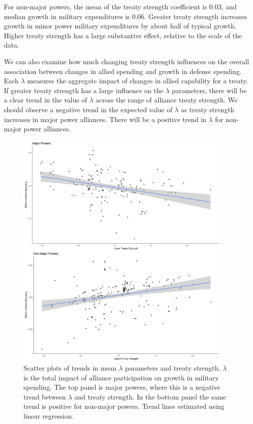 \documentclass[12pt]{article}
\begin{document}
For non-major powers, the mean of the treaty strength coefficient is 0.03, and median growth in military expenditures is 0.06. 
Greater treaty strength increases growth in minor power military expenditures by about half of typical growth. 
Higher treaty strength has a large substantive effect, relative to the scale of the data. 


We can also examine how much changing treaty strength influences on the overall association between changes in allied spending and growth in defense spending. 
Each $\lambda$ measures the aggregate impact of changes in allied capability for a treaty. 
If greater treaty strength has a large influence on the $\lambda$ parameters, there will be a clear trend in the value of $\lambda$ across the range of alliance treaty strength.
We should observe a negative trend in the expected value of $\lambda$ as treaty strength increases in major power alliances. 
There will be a positive trend in $\lambda$ for non-major power alliances. 


\begin{figure}[htbp]
	\centering
		\includegraphics[width=0.95\textwidth]{../figures/lambda-ls-scatter.png}
	\caption{Scatter plots of trends in mean $\lambda$ parameters and treaty strength. $\lambda$ is the total impact of alliance participation on growth in military spending. The top panel is major powers, where this is a negative trend between $\lambda$ and treaty strength. In the bottom panel the same trend is positive for non-major powers. Trend lines estimated using linear regression.}
	\label{fig:lambda-ls-scatter}
\end{figure}
\end{document}
